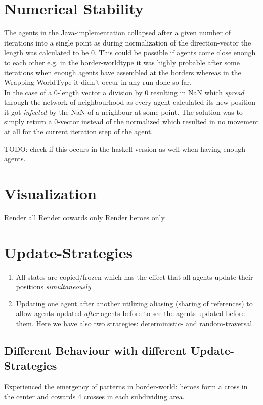 \section{Numerical Stability}
The agents in the Java-implementation collapsed after a given number of iterations into a single point as during normalization of the direction-vector the length was calculated to be 0. This could be possible if agents come close enough to each other e.g. in the border-worldtype it was highly probable after some iterations when enough agents have assembled at the borders whereas in the Wrapping-WorldType it didn't occur in any run done so far. \\
In the case of a 0-length vector a division by 0  resulting in NaN which \textit{spread} through the network of neighbourhood as every agent calculated its new position it got \textit{infected} by the NaN of a neighbour at some point. The solution was to simply return a 0-vector instead of the normalized which resulted in no movement at all for the current iteration step of the agent. 

TODO: check if this occurs in the haskell-version as well when having enough agents.

\section{Visualization}
Render all
Render cowards only
Render heroes only


\section{Update-Strategies}
\begin{enumerate}
\item All states are copied/frozen which has the effect that all agents update their positions \textit{simultaneously}
\item Updating one agent after another utilizing aliasing (sharing of references) to allow agents updated \textit{after} agents before to see the agents updated before them. Here we have also two strategies: deterministic- and random-traversal
\end{enumerate}


\subsection{Different Behaviour with different Update-Strategies}
Experienced the emergency of patterns in border-world: heroes form a cross in the center and cowards 4 crosses in each subdividing area.

